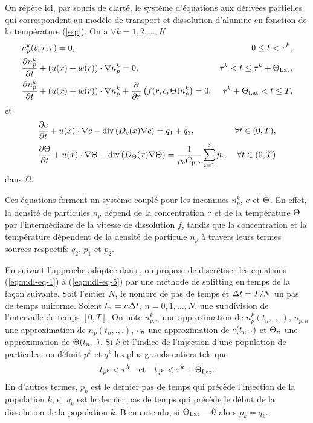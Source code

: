 On répète ici, par soucis de clarté, le système d'équations aux
dérivées partielles qui correspondent au modèle de transport et
dissolution d'alumine en fonction de la température (\ref{eq:}). On a $\forall k =
1, 2, \dots, K$
\begin{align}
  & n_p^k(t, x, r) = 0,
  & 0\leq t < \tau^k,\label{eq:mdl-eq-1}\\
%
  & \frac{\partial n_p^k}{\partial t} + \parent{u(x) + w(r)}\cdot \nabla  n_p^k = 0,
  & \tau^k < t \leq \tau^k + \tlat,\label{eq:mdl-eq-2}\\
%
  & \frac{\partial n_p^k}{\partial t} + \parent{u(x) + w(r)}\cdot \nabla  n_p^k + \frac{\partial }{\partial r}\parent{f(r, \concentration, \temperature)n_p^k} = 0,
  & \tau^k + \tlat < t \leq \tend,\label{eq:mdl-eq-3}
\end{align}
et
\begin{align}
  & \frac{\partial \concentration}{\partial t} + u(x)\cdot\nabla \concentration - \div\parent{\cdiffusivity(x) \nabla \concentration} = q_1 + q_2,
  & \forall t\in (0, T),\label{eq:mdl-eq-4}\\
%
  & \frac{\partial \temperature}{\partial t} + u(x)\cdot\nabla\temperature - \div\parent{\electrolytetdiff(x)\nabla \temperature} = \frac{1}{\electrolytedensity\electrolytehc}\sum_{i = 1}^{3}p_i,
  & \forall t\in(0, T)\label{eq:mdl-eq-5}
\end{align}
dans $\Omega$.

Ces équations forment un système couplé pour les inconnues $n_p^k$,
$c$ et $\Theta$. En effet, la densité de
particules $n_p$ dépend de la concentration $c$ et de
la température $\Theta$ par l'intermédiaire de la vitesse de
dissolution $f$, tandis que la concentration et la température
dépendent de la densité de particule $n_p$ à travers leurs termes
sources respectifs $q_2$, $p_1$ et $p_2$.

En suivant l'approche adoptée dans \cite{Hofer2011}, on propose de
discrétiser les équations (\ref{eq:mdl-eq-1}) à (\ref{eq:mdl-eq-5})
par une méthode de splitting en temps de la façon suivante. Soit
l'entier $N$, le nombre de pas de temps et $\Delta t = T/N$ un pas de temps
uniforme. Soient $t_n = n\Delta t$, $n = 0, 1, \dots, N$, une subdivision
de l'intervalle de temps $[0, T]$. On note $n_{p,n}^k$ une
approximation de $n_p^k(t_n, ., .)$, $n_{p,n}$ une approximation de
$n_p(t_n, ., .)$, $c_n$ une approximation de
$c(t_n, .)$ et $\Theta_n$ une approximation de
$\Theta(t_n, .)$. Si $k$ et l'indice de l'injection d'une
population de particules, on définit $p^k$ et $q^k$ les plus grands
entiers tels que
\begin{equation}
  t_{p^k} < \tau^k \quad\text{et}\quad t_{q^k} < \tau^k + \Theta_\text{Lat}.
\end{equation}
En d'autres termes, $p_k$ est le dernier pas de temps qui précède
l'injection de la population $k$, et $q_k$ est le dernier pas de temps
qui précède le début de la dissolution de la population $k$. Bien
entendu, si $\Theta_\text{Lat} = 0$ alors $p_k = q_k$.

